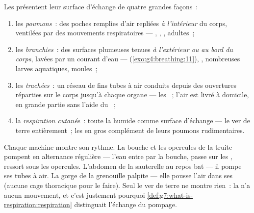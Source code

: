 \begin{definition}\label{def:g7:how-animals-breathe:four}
Les  présentent leur surface d'échange de quatre grandes
façons~:
\begin{enumerate}
  \item les \emph{poumons}~: des poches remplies d'air
        repliées \emph{à l'intérieur} du corps, ventilées par des
        mouvements respiratoires --- , , ,
         adultes~;
  \item les \emph{branchies}~: des surfaces
        plumeuses tenues \emph{à l'extérieur ou au bord du corps},
        lavées par un courant d'eau --- 
        (\cref{exo:g4:breathing:11}), , nombreuses larves
        aquatiques, moules~;
  \item les \emph{trachées}~: un réseau de
        fins tubes à air conduits depuis des ouvertures réparties
        sur le corps jusqu'à chaque organe --- les ~; l'air
        est livré à domicile, en grande partie sans l'aide du
        ~;
  \item la \emph{respiration cutanée}~:
        toute la  humide comme surface d'échange --- le ver de
        terre entièrement~; les  en gros complément de
        leurs poumons rudimentaires.
\end{enumerate}
\end{definition}

\begin{example}\label{ex:g7:how-animals-breathe:watch}
Chaque machine montre son rythme. La bouche et les opercules de la
truite pompent en alternance régulière --- l'eau entre par la
bouche, passe sur les , ressort sous les opercules.
L'abdomen de la sauterelle au repos bat --- il pompe ses tubes à
air. La gorge de la grenouille palpite --- elle pousse l'air dans
ses  (aucune cage thoracique pour le faire). Seul le ver de
terre ne montre rien~: la  n'a aucun mouvement,
et c'est justement pourquoi
\cref{def:g7:what-is-respiration:respiration} distinguait l'échange
du pompage.
\end{example}

